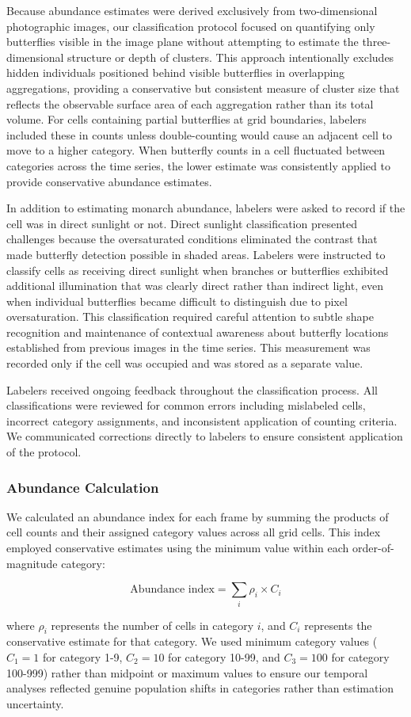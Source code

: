 Because abundance estimates were derived exclusively from two-dimensional photographic images, our classification protocol focused on quantifying only butterflies visible in the image plane without attempting to estimate the three-dimensional structure or depth of clusters. This approach intentionally excludes hidden individuals positioned behind visible butterflies in overlapping aggregations, providing a conservative but consistent measure of cluster size that reflects the observable surface area of each aggregation rather than its total volume. For cells containing partial butterflies at grid boundaries, labelers included these in counts unless double-counting would cause an adjacent cell to move to a higher category. When butterfly counts in a cell fluctuated between categories across the time series, the lower estimate was consistently applied to provide conservative abundance estimates.

In addition to estimating monarch abundance, labelers were asked to record if the cell was in direct sunlight or not. Direct sunlight classification presented challenges because the oversaturated conditions eliminated the contrast that made butterfly detection possible in shaded areas. Labelers were instructed to classify cells as receiving direct sunlight when branches or butterflies exhibited additional illumination that was clearly direct rather than indirect light, even when individual butterflies became difficult to distinguish due to pixel oversaturation. This classification required careful attention to subtle shape recognition and maintenance of contextual awareness about butterfly locations established from previous images in the time series. This measurement was recorded only if the cell was occupied and was stored as a separate value.

Labelers received ongoing feedback throughout the classification process. All classifications were reviewed for common errors including mislabeled cells, incorrect category assignments, and inconsistent application of counting criteria. We communicated corrections directly to labelers to ensure consistent application of the protocol.

\subsubsection{Abundance Calculation}

We calculated an abundance index for each frame by summing the products of cell counts and their assigned category values across all grid cells. This index employed conservative estimates using the minimum value within each order-of-magnitude category:

\begin{equation}
\text{Abundance index} = \sum_{i} \rho_i \times C_i
\end{equation}

where $\rho_i$ represents the number of cells in category $i$, and $C_i$ represents the conservative estimate for that category. We used minimum category values ($C_1 = 1$ for category 1-9, $C_2 = 10$ for category 10-99, and $C_3 = 100$ for category 100-999) rather than midpoint or maximum values to ensure our temporal analyses reflected genuine population shifts in categories rather than estimation uncertainty.